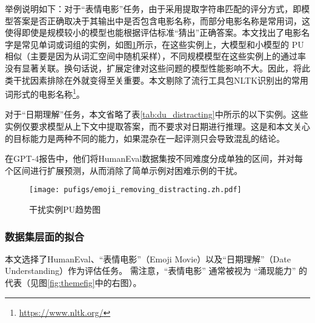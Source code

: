 举例说明如下：对于“表情电影”任务，由于采用提取字符串匹配的评分方式，即模型答案是否正确取决于其输出中是否包含电影名称，而部分电影名称是常用词，这使得即使是规模较小的模型也能根据评估标准“猜出”正确答案。本文找出了电影名字是常见单词或词组的实例，如图\ref{fig:emoji_common_words}所示，在这些实例上，大模型和小模型的 \textsc{PU} 相似（主要是因为从词汇空间中随机采样），不同规模模型在这些实例上的通过率没有显著关联。换句话说，扩展定律对这些问题的模型性能影响不大。因此，将此类干扰因素排除在外就变得至关重要。本文剔除了流行工具包NLTK识别出的常用词形式的电影名称\footnote{\url{https://www.nltk.org/}}。

对于“日期理解”任务，本文省略了表\ref{tab:du_distracting}中所示的以下实例。这些实例仅要求模型从上下文中提取答案，而不要求对日期进行推理。这是和本文关心的目标能力是两种不同的能力，如果混杂在一起评测只会导致混乱的结论。

在GPT-4报告\citep{openai2023gpt4}中，他们将HumanEval数据集按不同难度分成单独的区间，并对每个区间进行扩展预测，从而消除了简单示例对困难示例的干扰。

\begin{table}[!htbp]
\centering
\caption{“日期理解”任务中的干扰实例}
    \label{tab:du_distracting}
\end{table}

\begin{figure}[h]
    \centering
\texttt{[image: pufigs/emoji\_removing\_distracting.zh.pdf]}
\caption{干扰实例PU趋势图}
    \label{fig:emoji_common_words}
\end{figure}



\subsubsection{数据集层面的拟合}
本文选择了HumanEval\citep{chen2021evaluating}、“表情电影”（Emoji Movie）以及“日期理解”（Date Understanding）\citep{srivastava2022beyond}作为评估任务。
需注意，“表情电影” 通常被视为 “涌现能力” 的代表\citep{srivastava2022beyond}（见图\ref{fig:themefig}中的右图）。


